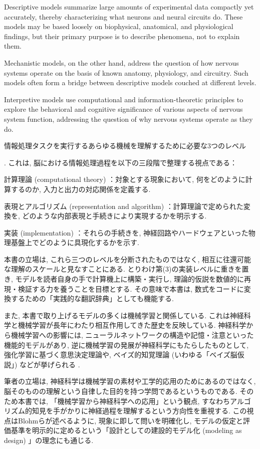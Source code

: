 \documentclass[titlepage]{ltjsbook}
\begin{document}
Descriptive models summarize large amounts of experimental data compactly yet accurately, thereby characterizing what neurons and neural circuits do. These models may be based loosely on biophysical, anatomical, and physiological findings, but their primary purpose is to describe phenomena, not to explain them. 

Mechanistic models, on the other hand, address the question of how nervous systems operate on the basis of known anatomy, physiology, and circuitry. Such models often form a bridge between descriptive models couched at different levels. 

Interpretive models use computational and information-theoretic principles to explore the behavioral and cognitive significance of various aspects of nervous system function, addressing the question of why nervous systems operate as they do.

情報処理タスクを実行するあらゆる機械を理解するために必要な3つのレベル


. これは, 脳における情報処理過程を以下の三段階で整理する視点である：

計算理論 (computational theory) ：対象とする現象において, 何をどのように計算するのか, 入力と出力の対応関係を定義する. 

表現とアルゴリズム (representation and algorithm) ：計算理論で定められた変換を, どのような内部表現と手続きにより実現するかを明示する. 

実装 (implementation) ：それらの手続きを, 神経回路やハードウェアといった物理基盤上でどのように具現化するかを示す. 

本書の立場は, これら三つのレベルを分断されたものではなく, 相互に往還可能な理解のスケールと見なすことにある. とりわけ第(3)の実装レベルに重きを置き, モデルを読者自身の手で計算機上に構築・実行し, 理論的仮説を数値的に再現・検証する力を養うことを目標とする. その意味で本書は, 数式をコードに変換するための「実践的な翻訳辞典」としても機能する. 

また, 本書で取り上げるモデルの多くは機械学習と関係している. これは神経科学と機械学習が長年にわたり相互作用してきた歴史を反映している. 神経科学から機械学習への影響には, ニューラルネットワークの構造や記憶・注意といった機能的モデルがあり, 逆に機械学習の発展が神経科学にもたらしたものとして, 強化学習に基づく意思決定理論や, ベイズ的知覚理論 (いわゆる「ベイズ脳仮説」) などが挙げられる \citep{Hassabis2017-zm}. 

筆者の立場は, 神経科学は機械学習の素材や工学的応用のためにあるのではなく, 脳そのものの理解という自律した目的を持つ学問であるというものである. そのため本書では, 「機械学習から神経科学への応用」という観点, すなわちアルゴリズム的知見を手がかりに神経過程を理解するという方向性を重視する. この視点はBlohmらが述べるように, 現象に即して問いを明確化し, モデルの仮定と評価基準を明示的に定めるという「設計としての建設的モデル化 (modeling as design) 」の理念にも通じる. 
\end{document}
